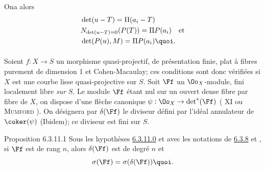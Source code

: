 On\pageoriginale a alors
\begin{align*}
& \det(u-T)=\Pi(a_{i}-T)\\
& N_{\det(u-T)=0}(P(T))=\Pi P(a_{i})\quad\mbox{\rm et}\\
& \det(P(u),M)=\Pi P(a_{i}){\quoi}.
\end{align*}

\setcounter{subsubsection}{11}
\setcounter{paragraph}{-1}
\paragraph{}
Soient $f:X\rightarrow S$ un morphisme quasi-projectif, de
présentation finie, plat à fibres purement de dimension 1 et
Cohen-Macaulay; ces conditions sont donc vérifiées si $X$ est une
courbe lisse quasi-projective sur $S$. Soit $\Ff $ un
$\Oo_{X}$-module, fini localement libre \emph{sur} $S$. Le module
$\Ff $ étant nul sur un ouvert dense fibre par fibre de $X$,
on dispose d'une flèche canonique $\psi:\Oo_{X}\rightarrow
\det^{\ast}(\Ff )$ ( XI ou \textsc{Mumford} ). On
désignera par $\delta(\Ff )$ le diviseur défini par l'idéal
annulateur de $\coker(\psi)$ (Ibidem); ce diviseur est fini sur $S$.

\begin{enonce*}{Proposition 6.3.11.1}
Sous les hypothèses \hyperref[XVII.par6.3.11.0]{6.3.11.0} et avec les notations de
\hyperref[XVII.subsubsec6.3.8]{6.3.8} et , si $\Ff $ est de
rang $n$, alors $\delta(\Ff )$ est de degré $n$ et
\[
\sigma(\Ff )=\sigma(\delta(\Ff )){\quoi}.
\]
\end{enonce*}

